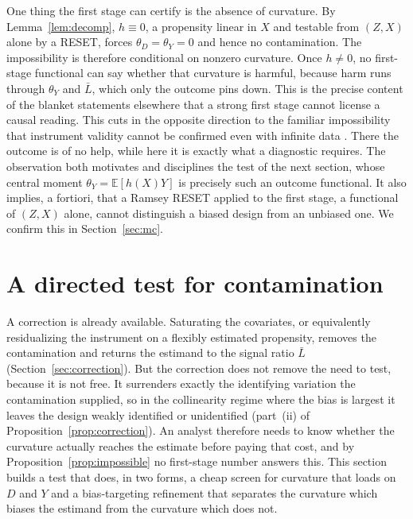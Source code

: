 \documentclass[preprint,11pt,authoryear]{elsarticle}
\theoremstyle{definition}
\newcommand{\E}{\mathbb{E}}
\begin{document}
One thing the first stage can certify is the absence of curvature. By
Lemma~\ref{lem:decomp}, $h\equiv0$, a propensity linear in $X$ and testable from $(Z,X)$
alone by a RESET, forces $\theta_D=\theta_Y=0$ and hence no contamination. The
impossibility is therefore conditional on nonzero curvature. Once
$h\neq0$, no first-stage functional can say whether that curvature is harmful,
because harm runs through $\theta_Y$ and $\bar L$, which only the outcome pins down.
This is the precise content of the blanket statements elsewhere that a strong first
stage cannot license a causal reading. This cuts in the opposite direction to the
familiar impossibility that instrument validity cannot be confirmed even
with
infinite data \citep{ssu2026}. There the outcome is of no help, while here it is
exactly what a diagnostic requires. The observation both motivates and disciplines
the test of the next section, whose central moment $\theta_Y=\E[h(X)Y]$ is
precisely such an outcome functional. It also implies, a fortiori, that a Ramsey
RESET applied to the first stage, a functional of $(Z,X)$ alone, cannot
distinguish a biased design from an unbiased one. We confirm this in
Section~\ref{sec:mc}.

\section{A directed test for contamination}\label{sec:test}

A correction is already available. Saturating the covariates, or equivalently
residualizing the instrument on a flexibly estimated propensity, removes the
contamination and returns the estimand to the signal ratio $\bar L$
(Section~\ref{sec:correction}). But the correction does not remove the need to test, because it is not
free. It surrenders exactly the identifying variation the
contamination supplied, so in the collinearity regime where the bias is largest it leaves
the design weakly identified or unidentified (part~(ii) of
Proposition~\ref{prop:correction}). An analyst therefore needs to know whether the
curvature actually reaches the estimate before paying that cost, and by
Proposition~\ref{prop:impossible} no first-stage number answers this. This section builds
a test that does, in two forms, a cheap screen for curvature that loads on $D$ and $Y$
and a bias-targeting refinement that separates the curvature which biases the estimand
from the curvature which does not.
\end{document}

